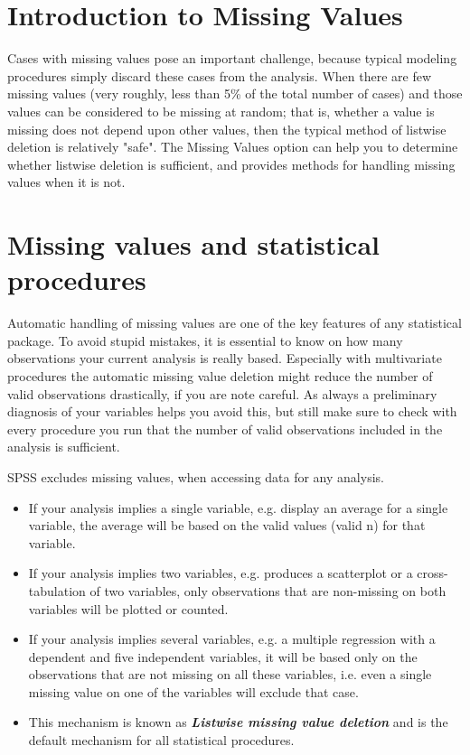 \documentclass[a4paper,12pt]{article}
\begin{document}
\tableofcontents

\section{Introduction to Missing Values}

Cases with missing values pose an important challenge, because typical modeling procedures simply discard these cases from the analysis. When there are few missing values (very roughly, less than 5\% of the total number of cases) and those values can be considered to be missing at random; that is, whether a value is missing does not depend upon other values, then the typical method of listwise deletion is relatively "safe". The Missing Values option can help you to determine whether listwise deletion is sufficient, and provides methods for handling missing values when it is not.
\section{Missing values and statistical procedures}
Automatic handling of missing values are one of the key features of any statistical package. To avoid stupid mistakes, it is essential to know on how many observations your current analysis is really based. Especially with multivariate procedures the automatic missing value deletion might reduce the number of valid observations drastically, if you are note careful. As always a preliminary diagnosis of your variables helps you avoid this, but still make sure to check with every procedure you run that the number of valid observations included in the analysis is sufficient.

SPSS excludes missing values, when accessing data for any analysis.

\begin{itemize}
\item If your analysis implies a single variable, e.g. display an average for a single variable, the average will be based on the valid values (valid n) for that variable.
\item If your analysis implies two variables, e.g. produces a scatterplot or a cross-tabulation of two variables, only observations that are non-missing on both variables will be plotted or counted.
\item If your analysis implies several variables, e.g. a multiple regression with a dependent and five independent variables, it will be based only on the observations that are not missing on all these variables, i.e. even a single missing value on one of the variables will exclude that case.
\item This mechanism is known as \textbf{\textit{Listwise missing value deletion}} and is the default mechanism for all statistical procedures. 
\end{itemize}
\end{document}
